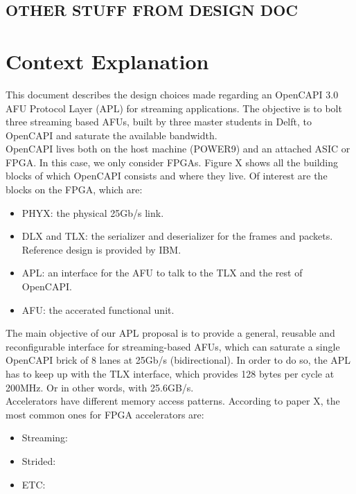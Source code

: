 \newpage
\section{OTHER STUFF FROM DESIGN DOC}
\chapter{Context Explanation}

This document describes the design choices made regarding an OpenCAPI 3.0 AFU Protocol Layer (APL) for streaming applications. The objective is to bolt three streaming based AFUs, built by three master students in Delft, to OpenCAPI and saturate the available bandwidth.\\
OpenCAPI lives both on the host machine (POWER9) and an attached ASIC or FPGA. In this case, we only consider FPGAs. Figure X shows all the building blocks of which OpenCAPI consists and where they live. Of interest are the blocks on the FPGA, which are:
\begin{itemize}
	\item PHYX: the physical 25Gb/s link.
	\item DLX and TLX: the serializer and deserializer for the frames and packets. Reference design is provided by IBM.
	\item APL: an interface for the AFU to talk to the TLX and the rest of OpenCAPI.
	\item AFU: the accerated functional unit.
\end{itemize}
The main objective of our APL proposal is to provide a general, reusable and reconfigurable interface for streaming-based AFUs, which can saturate a single OpenCAPI brick of 8 lanes at 25Gb/s (bidirectional). In order to do so, the APL has to keep up with the TLX interface, which provides 128 bytes per cycle at 200MHz. Or in other words, with 25.6GB/s.\\
Accelerators have different memory access patterns. According to paper X, the most common ones for FPGA accelerators are:
\begin{itemize}
	\item Streaming:
	\item Strided:
	\item ETC:
\end{itemize}
